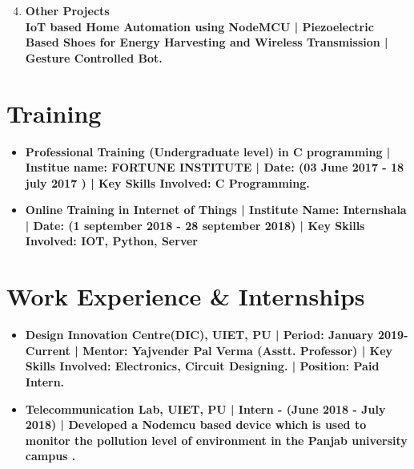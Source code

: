 \documentclass[11pt]{article}
\begin{document}
\begin{vwcol}[widths={0.235,0.6}, sep=1.3cm, justify=flush, rule=0.1pt, indent=0em]
\begin{minipage}{12.73cm}\vspace{2mm}
\begin{enumerate}[leftmargin=*]
\setcounter{enumi}{3}


\item \bfseries Other Projects\\
\mdseries IoT based Home Automation using NodeMCU | Piezoelectric Based Shoes for Energy Harvesting and Wireless Transmission | Gesture Controlled Bot. 
\end{enumerate}
\end{minipage}
\end{vwcol}

\pagebreak
\begin{minipage}{18cm}
\fontsize{10pt}{13pt}\selectfont



\section{Training}
\begin{itemize}[leftmargin=*]
\item \bfseries Professional Training \mdseries (Undergraduate level) in C programming | Institue name: FORTUNE INSTITUTE | Date: (03 June 2017 - 18 july 2017 ) | Key Skills Involved: C Programming.\\



\item \bfseries Online Training \mdseries in Internet of Things | Institute Name: Internshala | Date: (1 september 2018 - 28 september 2018) | Key Skills Involved: IOT, Python, Server\\
\end{itemize}

\section{Work Experience \& Internships}
\begin{itemize}[leftmargin=*]
\item \bfseries Design Innovation Centre(DIC), UIET, PU \mdseries | Period: January 2019-Current | Mentor: Yajvender Pal Verma (Asstt. Professor) | Key Skills Involved: Electronics, Circuit Designing. | Position: Paid Intern.\\

\item \bfseries Telecommunication Lab, UIET, PU \mdseries | Intern - (June 2018 - July 2018) | Developed a Nodemcu based device which is used to monitor the pollution level of environment in the Panjab university campus .\\



\end{itemize}
\end{minipage}
\end{document}
